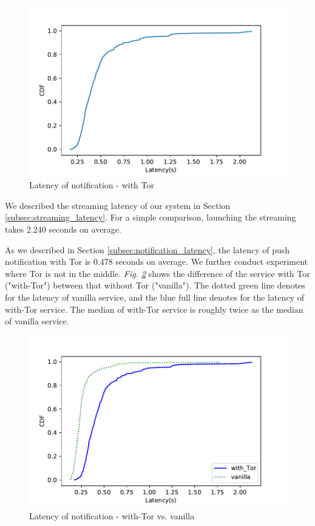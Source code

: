 \begin{figure}
	\includegraphics[width=\linewidth]{notification_latency_withTor.pdf}
	\caption{Latency of notification - with Tor}
	\label{fig:notificationlatency_wTor}
\end{figure}


We described the streaming latency of our system in Section \ref{subsec:streaming_latency}. For a simple comparison, launching the streaming takes 2.240 seconds on average.


As we described in Section \ref{subsec:notification_latency}, the latency of push notification with Tor is 0.478 seconds on average. We further conduct experiment where Tor is not in the middle. \textit{Fig. \ref{fig:notificationlatency_wTor_vs_vanilla}} shows the difference of the service with Tor ("with-Tor") between that without Tor ("vanilla"). The dotted green line denotes for the latency of vanilla service, and the blue full line denotes for the latency of with-Tor service. The median of with-Tor service is roughly twice as the median of vanilla service.

\begin{figure}
	\includegraphics[width=\linewidth]{plot_push_tor_vs_vanilla.pdf}
	\caption{Latency of notification - with-Tor vs. vanilla}
	\label{fig:notificationlatency_wTor_vs_vanilla}
\end{figure}